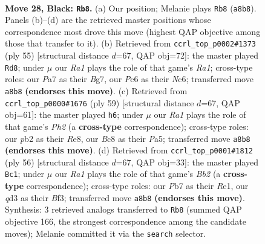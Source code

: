 \documentclass[11pt]{article}
\begin{document}
\clearpage

\begin{figure}[p]\centering
\begin{subfigure}{0.46\textwidth}\centering
\resizebox{\linewidth}{!}{%
\newchessgame
\chessboard[
  setfen={r1b5/pp4k1/n1pq2p1/6pp/3P4/PB1Q1PP1/1P2R2P/2R3K1 b - - 3 28},
  showmover=false,
  pgfstyle=straightmove, color=movearrow, markmove={a8-b8}
]}
\caption{}
\end{subfigure}\hfill
\begin{subfigure}{0.46\textwidth}\centering
\resizebox{\linewidth}{!}{%
\newchessgame
\chessboard[
  setfen={r5k1/5pbp/p1n5/1pq1p3/5pPN/2P4P/PP2QP2/2BR2K1 b - - 1 28},
  showmover=false,
  pgfstyle=straightmove, color=movearrow, markmove={a8-d8}
]}
\caption{}
\end{subfigure}
\\[4pt]
\begin{subfigure}{0.46\textwidth}\centering
\resizebox{\linewidth}{!}{%
\newchessgame
\chessboard[
  setfen={4r3/2k4p/1pp2q2/p1n1p1pP/8/P3QPP1/1PP1B3/1K5R b - - 1 30},
  showmover=false,
  pgfstyle=straightmove, color=movearrow, markmove={h7-h6}
]}
\caption{}
\end{subfigure}\hfill
\begin{subfigure}{0.46\textwidth}\centering
\resizebox{\linewidth}{!}{%
\newchessgame
\chessboard[
  setfen={2br2k1/5pp1/2pq3p/p2n4/1pQP3P/1P3BP1/PB3P2/4R1K1 w - - 1 29},
  showmover=false,
  pgfstyle=straightmove, color=movearrow, markmove={b2-c1}
]}
\caption{}
\end{subfigure}
\caption{\textbf{Move 28, Black: \texttt{Rb8}.} (a) Our position; Melanie plays \texttt{Rb8} (\texttt{a8b8}). Panels (b)--(d) are the retrieved master positions whose correspondence most drove this move (highest QAP objective among those that transfer to it). (b) Retrieved from \texttt{ccrl\_top\_p0002\#1373} (ply 55) [structural distance $d$=67, QAP obj=72]: the master played \texttt{Rd8}; under $\mu$ our \emph{Ra1} plays the role of that game's \emph{Ra1}; cross-type roles: our \emph{P}a7 as their \emph{B}g7, our \emph{P}c6 as their \emph{N}c6; transferred move \texttt{a8b8} \textbf{(endorses this move)}. (c) Retrieved from \texttt{ccrl\_top\_p0000\#1676} (ply 59) [structural distance $d$=67, QAP obj=61]: the master played \texttt{h6}; under $\mu$ our \emph{Ra1} plays the role of that game's \emph{Ph2} (a \textbf{cross-type} correspondence); cross-type roles: our \emph{p}b2 as their \emph{R}e8, our \emph{B}c8 as their \emph{P}a5; transferred move \texttt{a8b8} \textbf{(endorses this move)}. (d) Retrieved from \texttt{ccrl\_top\_p0001\#1812} (ply 56) [structural distance $d$=67, QAP obj=33]: the master played \texttt{Bc1}; under $\mu$ our \emph{Ra1} plays the role of that game's \emph{Bb2} (a \textbf{cross-type} correspondence); cross-type roles: our \emph{P}b7 as their \emph{R}e1, our \emph{q}d3 as their \emph{B}f3; transferred move \texttt{a8b8} \textbf{(endorses this move)}. Synthesis: 3 retrieved analogs transferred to \texttt{Rb8} (summed QAP objective 166, the strongest correspondence among the candidate moves); Melanie committed it via the \texttt{search} selector.}
\label{fig:thought-m55}
\end{figure}
\end{document}

